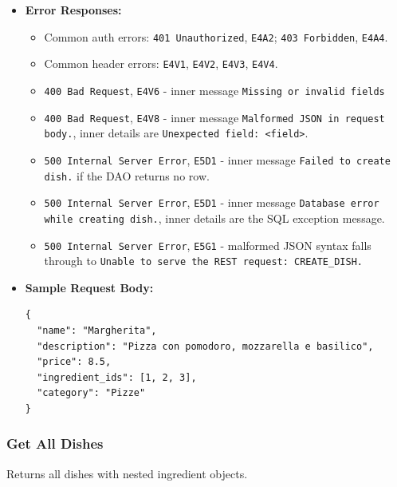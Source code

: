 \begin{itemize}[nosep]
\item \textbf{Error Responses:}

\begin{itemize}[nosep]
\item Common auth errors: \texttt{401 Unauthorized}, \texttt{E4A2}; \texttt{403 Forbidden}, \texttt{E4A4}.
\item Common header errors: \texttt{E4V1}, \texttt{E4V2}, \texttt{E4V3}, \texttt{E4V4}.
\item \texttt{400 Bad Request}, \texttt{E4V6} - inner message \texttt{Missing or invalid fields}
\item \texttt{400 Bad Request}, \texttt{E4V8} - inner message \texttt{Malformed JSON in request body.}, inner details are \texttt{Unexpected field: <field>}.
\item \texttt{500 Internal Server Error}, \texttt{E5D1} - inner message \texttt{Failed to create dish.} if the DAO returns no row.
\item \texttt{500 Internal Server Error}, \texttt{E5D1} - inner message \texttt{Database error while creating dish.}, inner details are the SQL exception message.
\item \texttt{500 Internal Server Error}, \texttt{E5G1} - malformed JSON syntax falls through to \texttt{Unable to serve the REST request: CREATE\_DISH.}
\end{itemize}

\item \textbf{Sample Request Body:}

\begin{lstlisting}
{
  "name": "Margherita",
  "description": "Pizza con pomodoro, mozzarella e basilico",
  "price": 8.5,
  "ingredient_ids": [1, 2, 3],
  "category": "Pizze"
}
\end{lstlisting}
\end{itemize}

\subsubsection*{Get All Dishes}

Returns all dishes with nested ingredient objects.

